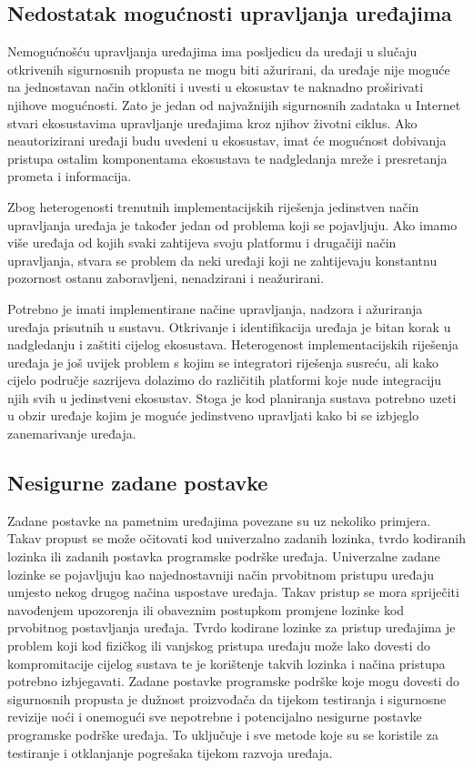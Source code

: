 \documentclass[times, utf8, diplomski]{fer}
\begin{document}
\subsection{Nedostatak mogućnosti upravljanja uređajima}
Nemogućnošću upravljanja uređajima ima posljedicu da uređaji u slučaju otkrivenih sigurnosnih propusta ne mogu biti ažurirani, da uređaje nije moguće na jednostavan način otkloniti i uvesti u ekosustav te naknadno proširivati njihove mogućnosti. Zato je jedan od najvažnijih sigurnosnih zadataka u Internet stvari ekosustavima upravljanje uređajima kroz njihov životni ciklus. Ako neautorizirani uređaji budu uvedeni u ekosustav, imat će mogućnost dobivanja pristupa ostalim komponentama ekosustava te nadgledanja mreže i presretanja prometa i informacija. 

Zbog heterogenosti trenutnih implementacijskih riješenja jedinstven način upravljanja uređaja je također jedan od problema koji se pojavljuju. Ako imamo više uređaja od kojih svaki zahtijeva svoju platformu i drugačiji način upravljanja, stvara se problem da neki uređaji koji ne zahtijevaju konstantnu pozornost ostanu zaboravljeni, nenadzirani i neažurirani. 

Potrebno je imati implementirane načine upravljanja, nadzora i ažuriranja uređaja prisutnih u sustavu. Otkrivanje i identifikacija uređaja je bitan korak u nadgledanju i zaštiti cijelog ekosustava. Heterogenost implementacijskih riješenja uređaja je još uvijek problem s kojim se integratori riješenja susreću, ali kako cijelo područje sazrijeva dolazimo do različitih platformi koje nude integraciju njih svih u jedinstveni ekosustav. Stoga je kod planiranja sustava potrebno uzeti u obzir uređaje kojim je moguće jedinstveno upravljati kako bi se izbjeglo zanemarivanje uređaja.

\subsection{Nesigurne zadane postavke}
Zadane postavke na pametnim uređajima povezane su uz nekoliko primjera. Takav propust se može očitovati kod univerzalno zadanih lozinka, tvrdo kodiranih lozinka ili zadanih postavka programske podrške uređaja. Univerzalne zadane lozinke se pojavljuju kao najednostavniji način prvobitnom pristupu uređaju umjesto nekog drugog načina uspostave uređaja. Takav pristup se mora spriječiti navođenjem upozorenja ili obaveznim postupkom promjene lozinke kod prvobitnog postavljanja uređaja. Tvrdo kodirane lozinke za pristup uređajima je problem koji kod fizičkog ili vanjskog pristupa uređaju može lako dovesti do kompromitacije cijelog sustava te je korištenje takvih lozinka i načina pristupa potrebno izbjegavati. Zadane postavke programske podrške koje mogu dovesti do sigurnosnih propusta je dužnost proizvođača da tijekom testiranja i sigurnosne revizije uoći i onemogući sve nepotrebne i potencijalno nesigurne postavke programske podrške uređaja. To uključuje i sve metode koje su se koristile za testiranje i otklanjanje pogrešaka tijekom razvoja uređaja.
\end{document}

